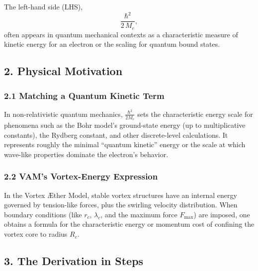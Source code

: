 \documentclass[aps,preprint,superscriptaddress]{revtex4-2}
\begin{document}
    The left-hand side (LHS),
    \[
        \frac{\hbar^2}{2\,M_e},
    \]
    often appears in quantum mechanical contexts as a characteristic measure of kinetic energy for an electron or the scaling for quantum bound states.

    \subsection*{2. Physical Motivation}

    \subsubsection*{2.1 Matching a Quantum Kinetic Term}
    In non-relativistic quantum mechanics, \(\frac{\hbar^2}{2M_e}\) sets the characteristic energy scale for phenomena such as the Bohr model’s ground-state energy (up to multiplicative constants), the Rydberg constant, and other discrete-level calculations. It represents roughly the minimal “quantum kinetic” energy or the scale at which wave-like properties dominate the electron’s behavior.

    \subsubsection*{2.2 VAM’s Vortex-Energy Expression}
    In the Vortex Æther Model, stable vortex structures have an internal energy governed by tension-like forces, plus the swirling velocity distribution. When boundary conditions (like \(r_c\), \(\lambda_c\), and the maximum force \(F_{\max}\)) are imposed, one obtains a formula for the characteristic energy or momentum cost of confining the vortex core to radius \(R_c\).

    \subsection*{3. The Derivation in Steps}
\end{document}
